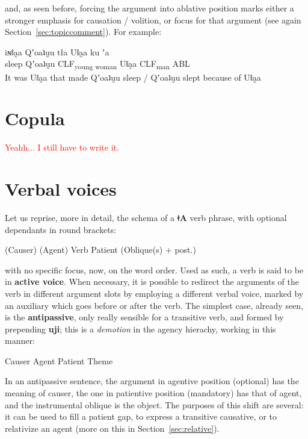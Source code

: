 \documentclass[11pt,a5paper]{book}
\newcommand{\qcn}[1]{\textcolor{AccentText}{\large\textbf{#1}}}
\newcommand{\langname}{\qcn{ǂA}}
\newcommand{\grammsc}[1]{\textsc{#1}}
\newcommand{\CLF}[1]{\grammsc{CLF}\textsubscript{#1}}
\newcommand{\cmnt}[1]{\textcolor{red}{#1}}
\begin{document}
and, as seen before, forcing the argument into ablative position marks either a stronger emphasis for causation / volition, or focus for that argument (see again Section~\ref{sec:topiccomment}). For example:

\begin{exe}
\ex
\gll iɴǁa̰a Qʼoaʇṵu tła  Uǁa̰a ku ʼa\\
 sleep Qʼoaʇṵu \CLF{young woman} Uǁa̰a \CLF{man} ABL\\
\glt It was Uǁa̰a that made Qʼoaʇṵu sleep / Qʼoaʇṵu slept because of Uǁa̰a
\end{exe}

\section{Copula}

\label{sec:copula}

\cmnt{Yeahh... I still have to write it.}

\section{Verbal voices}\label{sec:valencychanging}

Let us reprise, more in detail, the schema of a \langname{} verb phrase, with optional dependants in round brackets:

\begin{center}
(Causer) (Agent) Verb Patient (Oblique(s) + post.)
\end{center}

with no specific focus, now, on the word order. Used as such, a verb is said to be in \textbf{active voice}. When necessary, it is possible to redirect the arguments of the verb in different argument slots by employing a different verbal voice, marked by an auxiliary which goes before or after the verb. The simplest case, already seen, is the \textbf{antipassive}, only really sensible for a transitive verb, and formed by prepending \qcn{uji}; this is a \emph{demotion} in the agency hierachy, working in this manner:

\begin{center}
	Causer \textrightarrow Agent \textrightarrow Patient \textrightarrow Theme
\end{center}

In an antipassive sentence, the argument in agentive position (optional) has the meaning of causer, the one in patientive position (mandatory) has that of agent, and the instrumental oblique is the object. The purposes of this shift are several: it can be used to fill a patient gap, to express a transitive causative, or to relativize an agent (more on this in Section~\ref{sec:relative}).
\end{document}
